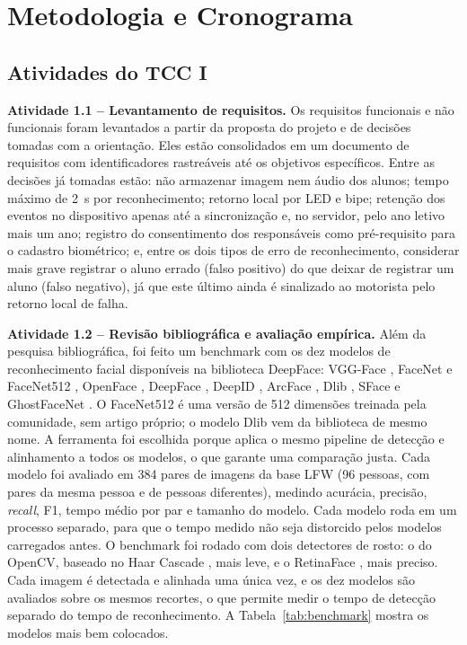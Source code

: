 \documentclass[
    12pt,
    oneside,
    a4paper,
    article,
    english,
    brazil
    ]{abntex2}
\begin{document}
\section{Metodologia e Cronograma}
\label{sec:metodologia}

\subsection{Atividades do TCC I}

\textbf{Atividade 1.1 -- Levantamento de requisitos.} Os requisitos funcionais
e não funcionais foram levantados a partir da proposta do projeto e de
decisões tomadas com a orientação. Eles estão consolidados em um documento de
requisitos com identificadores rastreáveis até os objetivos específicos. Entre
as decisões já tomadas estão: não armazenar imagem nem áudio dos alunos; tempo
máximo de 2~s por reconhecimento; retorno local por LED e bipe; retenção dos
eventos no dispositivo apenas até a sincronização e, no servidor, pelo ano
letivo mais um ano; registro do consentimento dos responsáveis como
pré-requisito para o cadastro biométrico; e, entre os dois tipos de erro de
reconhecimento, considerar mais grave registrar o aluno errado (falso positivo)
do que deixar de registrar um aluno (falso negativo), já que este último ainda
é sinalizado ao motorista pelo retorno local de falha.

\textbf{Atividade 1.2 -- Revisão bibliográfica e avaliação empírica.} Além da
pesquisa bibliográfica, foi feito um benchmark com os dez modelos de
reconhecimento facial disponíveis na biblioteca DeepFace: VGG-Face
\cite{parkhi2015vggface}, FaceNet e FaceNet512 \cite{schroff2015facenet},
OpenFace \cite{amos2016openface}, DeepFace \cite{taigman2014deepface}, DeepID
\cite{sun2014deepid}, ArcFace \cite{deng2019arcface}, Dlib \cite{king2009dlib},
SFace \cite{zhong2021sface} e GhostFaceNet \cite{alansari2023ghostfacenets}.
O FaceNet512 é uma versão de 512 dimensões treinada pela comunidade, sem artigo
próprio; o modelo Dlib vem da biblioteca de mesmo nome.
A ferramenta foi escolhida porque aplica o mesmo pipeline de detecção e
alinhamento a todos os modelos, o que garante uma comparação justa. Cada
modelo foi avaliado em 384 pares de imagens da base LFW (96 pessoas, com pares
da mesma pessoa e de pessoas diferentes), medindo acurácia, precisão,
\textit{recall}, F1, tempo médio por par e tamanho do modelo. Cada modelo roda
em um processo separado, para que o tempo medido não seja distorcido pelos
modelos carregados antes. O benchmark foi rodado com dois detectores de rosto:
o do OpenCV, baseado no Haar Cascade \cite{viola2001haar}, mais leve, e o
RetinaFace \cite{deng2020retinaface}, mais preciso. Cada imagem
é detectada e alinhada uma única vez, e os dez modelos são avaliados sobre os
mesmos recortes, o que permite medir o tempo de detecção separado do tempo de
reconhecimento. A Tabela~\ref{tab:benchmark} mostra os modelos mais bem
colocados.
\end{document}
